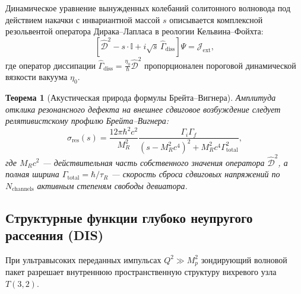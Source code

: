 \documentclass[12pt,a4paper]{article}
\newtheorem{theorem}{Теорема}
\begin{document}
	Динамическое уравнение вынужденных колебаний солитонного волновода под действием накачки с инвариантной массой $s$ описывается комплексной резольвентой оператора Дирака--Лапласа в реологии Кельвина--Фойхта:
	\begin{equation}
		\left[ \hat{\mathcal{D}}^2 - s \cdot \mathbb{I} + i \sqrt{s} \, \hat{\Gamma}_{\text{diss}} \right] \Psi = \mathcal{J}_{\text{ext}},
	\end{equation}
	где оператор диссипации $\hat{\Gamma}_{\text{diss}} = \frac{\eta_0}{\hbar} \hat{\mathcal{D}}^2$ пропорционален пороговой динамической вязкости вакуума $\eta_0$.
	
	\begin{theorem}[Акустическая природа формулы Брейта--Вигнера]
		Амплитуда отклика резонансного дефекта на внешнее сдвиговое возбуждение следует релятивистскому профилю Брейта--Вигнера:
		\begin{equation}
			\sigma_{\text{res}}(s) = \frac{12\pi \hbar^2 c^2}{M_R^2} \frac{\Gamma_i \Gamma_f}{(s - M_R^2 c^4)^2 + M_R^2 c^4 \Gamma_{\text{total}}^2},
		\end{equation}
		где $M_R c^2$ --- действительная часть собственного значения оператора $\hat{\mathcal{D}}^2$, а полная ширина $\Gamma_{\text{total}} = \hbar / \tau_R$ --- скорость сброса сдвиговых напряжений по $N_{\text{channels}}$ активным степеням свободы девиатора.
	\end{theorem}
	
	\subsection{Структурные функции глубоко неупругого рассеяния (DIS)}
	При ультравысоких переданных импульсах $Q^2 \gg M_p^2$ зондирующий волновой пакет разрешает внутреннюю пространственную структуру вихревого узла $T(3,2)$.
	
\end{document}

